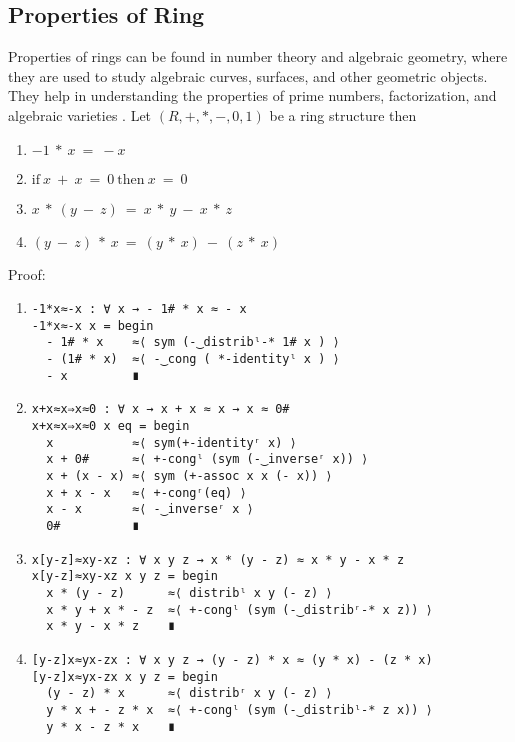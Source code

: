 \subsection{Properties of Ring}
Properties of rings can be found in number theory and algebraic geometry, where
they are used to study algebraic curves, surfaces, and other geometric objects.
They help in understanding the properties of prime numbers, factorization, and
algebraic varieties \cite{pedrouzo2021revisiting}. Let $(R, +, *, -, 0, 1)$ be a
ring structure then
\begin{enumerate}
\item \(- 1\ *\ x\ =\ -x\)
\item \(\text{if}\ x\ +\ x\ =\ 0\ \text{then}\ x\ =\ 0\)
\item \(x\ *\ (y\ -\ z)\ =\ x\ *\ y\ -\ x\ *\ z\)
\item \((y\ -\ z)\ *\ x\ =\ (y\ *\ x)\ -\ (z\ *\ x)\)
\end{enumerate}
Proof:
\begin{enumerate}
\item
\begin{verbatim}
-1*x≈-x : ∀ x → - 1# * x ≈ - x
-1*x≈-x x = begin
  - 1# * x    ≈⟨ sym (-‿distribˡ-* 1# x ) ⟩
  - (1# * x)  ≈⟨ -‿cong ( *-identityˡ x ) ⟩
  - x         ∎
\end{verbatim}
\item
\begin{verbatim}
x+x≈x⇒x≈0 : ∀ x → x + x ≈ x → x ≈ 0#
x+x≈x⇒x≈0 x eq = begin
  x           ≈⟨ sym(+-identityʳ x) ⟩
  x + 0#      ≈⟨ +-congˡ (sym (-‿inverseʳ x)) ⟩
  x + (x - x) ≈⟨ sym (+-assoc x x (- x)) ⟩
  x + x - x   ≈⟨ +-congʳ(eq) ⟩
  x - x       ≈⟨ -‿inverseʳ x ⟩
  0#          ∎
\end{verbatim}
\item
\begin{verbatim}
x[y-z]≈xy-xz : ∀ x y z → x * (y - z) ≈ x * y - x * z
x[y-z]≈xy-xz x y z = begin
  x * (y - z)      ≈⟨ distribˡ x y (- z) ⟩
  x * y + x * - z  ≈⟨ +-congˡ (sym (-‿distribʳ-* x z)) ⟩
  x * y - x * z    ∎
\end{verbatim}
\item
\begin{verbatim}
[y-z]x≈yx-zx : ∀ x y z → (y - z) * x ≈ (y * x) - (z * x)
[y-z]x≈yx-zx x y z = begin
  (y - z) * x      ≈⟨ distribʳ x y (- z) ⟩
  y * x + - z * x  ≈⟨ +-congˡ (sym (-‿distribˡ-* z x)) ⟩
  y * x - z * x    ∎
\end{verbatim}
\end{enumerate}